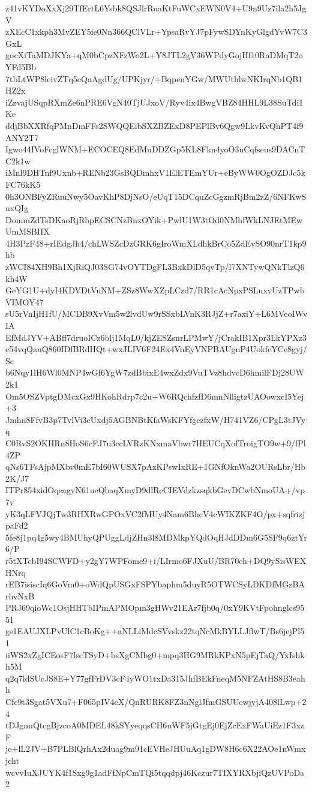 z41vKYDoXxXj29TfErtL6Ysbk8QSJlrRuaKtFuWCxEWN0V4+U9n9Uz7ila2h5JgV
zXEcC1xkph3MvZEY5ie0Nn366QClVLr+YpsaRvYJ7pFywSDYnKyGlgdYvW7C3GxL
gocXiTaMDJKYa+qM0bCpzNFzWo2L+Y8JTL2gV36WPdyGojHf10RaDMqT2oYFd5Bb
7tbLtWP8leivZTq5eQaAgdUg/UPKjyr/+BqpenYGw/MWUthlwNKIrqNb1QB1HZ2x
iZzvajUSqpRXmZe6nPRE6VgN40TjUJxoV/Ryv4ix4BwgVBZ84HHL9L38SuTdi1Ke
ddjBbXXRfqPMnDmFFs2SWQQEibSXZBZExD8PEPlBv6Qgw9LkvKvQhPT4f9ANY2T7
Igwo44IVoFcglWNM+ECOCEQ8EdMuDDZGp5KL8Fkn4yoO3uCqfseus9DACnTC2k1w
iMnl9DHTnf9Uxnb+RENb23GsBQDmhxV1ElETEmYUr+eByWW0OgOZDJc5kFC76kK5
0h3ONBFyZRuuNwy5OavKhP8DjNsO/eUqT15DCquZcGgzmRjBm2zZ/6NFKwSnxQIg
DommZdTsDKaoRjRbpECSCNzBnxOYik+PwlU1W3tOd0NMhfWkLNJEtMEwUmMSBIIX
4H3PzF48+rIEdgJh4/chLWSZcDzGRK6gIroWmXLdhkBrCo5ZdEvSO90nrT1kp9hb
zWCI84XH9Bh1XjRiQJ03SG74vOYTDgFL3BxkDlD5qvTp/l7XNTywQNkTlzQ6kh4W
GeYG1U+dyI4KDVDtVuNM+ZSz8WwXZpLCzd7/RR1cAcNpxPSLuxvUzTPwbVIMOY47
sU5rVnIjH1fU/MCDB9XvVm5w2lvdUw9rSSxbLVnK3RJjZ+r7axiY+L6MVeoIWvIA
EfMdJYV+ABff7druoICz6blj1MqL0/kjZESZsnrLPMwY/jCrakIB1Xpr3LkYPXz3
c54vqQauQ860IDfBRdHQt+wxJLIV6F24Ex4VnEyVNPBAUgnP4UokfeYCe8gyj/Sc
b6Nqy1lH6Wl0MNP4wGf6YgW7zdBbixE4wxZdx9VuTVz8hdvcD6hmilFDj28UW2k1
Om5OSZVptgDMcxGx9HKohRdrp7c2u+W6RQchfzfD6mnNlligtzUAOowxcI5Yej+3
Jmhn8FfvB3p7TvlVi3cUxdj5AGBNBtKfaWsKFYfgczfxW/H741VZ6/CPgL3tJVyq
C0RvS2OKHRn8HoS6cFJ7u3ccLVRzKNxmaVbwr7HEUCqXofTroigTO9w+9/fPl4ZP
qNs6TFsAjpMXbv0mE7bI60WUSX7pAzKPswIxRE+1GNfOknWa2OURsLbr/Hb2K/J7
ITPr854xidOqeagyN61ueQbaqXmyD9dlReCIEVdzkzsqkbGevDCwbNmoUA+/vp7v
yK3qLFVJQjTw3RHXRwGPOxVC2fMUy4Nam6BhcV4eWIKZKF4O/px+sqfrizjpaFd2
5fe8j1pq4g5wy4BMUhyQPUggLdjZHn3l8MDMkpYQdOqHJdDDm6G5SF9q6ztYr6/P
r5tXTcbI94SCWFD+y2gY7WPFome9+i/LIrmo6FJXuU/BR70ch+DQ9ySisWEXHNrq
rEB7isiscIq6GoVm0+oWdQpUSGxFSPYbaphm5duyR5OTWCSyLDKDfMGzBArhvNxB
PRJ69qioWc1OsjHHTbIPmAPMOpm3gHWv21EAr7fjb0q/0xY9KVtFpohnglcs9551
gs1EAUJXLPvUlC1cBoKg++aNLLiMdcSVvskz22tqNcMkBYLLJflwT/Bs6jejPl51
iiWS2xZgICEosF7lscTSyD+bsXgCMbg0+mpq3HG9MRkKPxN5pEjTaQ/YxIshkh5M
q2q7ldSUcJS8E+Y77gfFrDV3cF4yWO1txDa315JhfBEkFneqM5NFZAtHS8B3eahh
Cfc9t3Sgat5VXu7+F065pIV4cX/QnRURK8FZ3nNglJfmGSUUewjyjA408lLwp+24
tDJgnnQtcgBjzcoA0MDEL48kSYyeqqsCH6uWF5jGtgEj0EjZcExFWaUiEz1F3xzF
je+lL2JV+B7PLBlQrhAx2duag9m91cEVHeJHUuAq1gDW8H6c6X22AOe1nWmxjcht
wcvvIuXJUYK4f1Sxg9g1adFfNpCmTQi5tqqdpj46Kczur7TIXYRXbjiQzUVPoDa2
